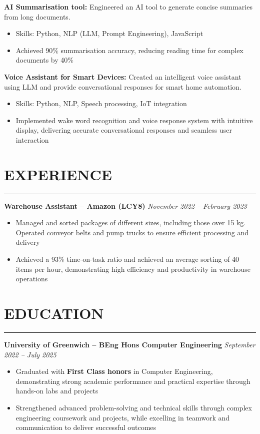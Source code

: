 \documentclass[11pt, letterpaper]{article} %
\newcommand{\resumesection}[1]{%
    \section*{#1}
    \vspace{-8pt}
    \noindent\rule{\textwidth}{0.6pt}
    \vspace{1pt}
    \noindent
}
\begin{document}
\noindent\textbf{AI Summarisation tool:} Engineered an AI tool to generate concise summaries from long documents.
\begin{itemize}
    \item Skills: Python, NLP (LLM, Prompt Engineering), JavaScript
    \item Achieved 90\% summarisation accuracy, reducing reading time for complex documents by 40\%
\end{itemize}

\vspace{6pt}

\noindent\textbf{Voice Assistant for Smart Devices:} Created an intelligent voice assistant using LLM and provide conversational responses for smart home automation.
\begin{itemize}
    \item Skills: Python, NLP, Speech processing, IoT integration
    \item Implemented wake word recognition and voice response system with intuitive display, delivering accurate conversational responses and seamless user interaction
\end{itemize}

\vspace{6pt}

\resumesection{EXPERIENCE}\noindent\textbf{Warehouse Assistant – Amazon (LCY8)} \hfill \textit{November 2022 – February 2023}
\begin{itemize}
    \item Managed and sorted packages of different sizes, including those over 15 kg. Operated conveyor belts and pump trucks to ensure efficient processing and delivery
    \item Achieved a 93\% time-on-task ratio and achieved an average sorting of 40 items per hour, demonstrating high efficiency and productivity in warehouse operations
\end{itemize}

\vspace{6pt}

\resumesection{EDUCATION}\textbf{University of Greenwich – BEng Hons Computer Engineering} \hfill \textit{September 2022 – July 2025}
\begin{itemize}
    \item Graduated with \textbf{First Class honors} in Computer Engineering, demonstrating strong academic performance and practical expertise through hands-on labs and projects
    \item Strengthened advanced problem-solving and technical skills through complex engineering coursework and projects, while excelling in teamwork and communication to deliver successful outcomes
\end{itemize}
\end{document}
